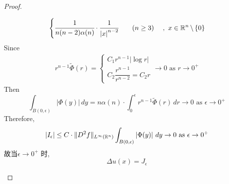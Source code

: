 \begin{thm}
\begin{proof}
\begin{enumerate}
\begin{itemize}
\begin{align}
\begin{cases}
							\cfrac{1}{n (n - 2) \alpha(n)} \cdot \cfrac{1}{\left| x \right|^{n - 2}} \hspace*{2em} (n \geq 3)
						\end{cases} , \,\, x \in \mathbb{R}^n \, \backslash \, \{ 0 \}
					\end{align}
					Since
					\begin{align}
						r^{n - 1} \widetilde{\Phi}(r) = 
						\begin{cases}
							C_1 r^{n - 1} \left| \log r \right| \\
							C_2 \dfrac{r^{n - 1}}{r^{n - 2}} = C_2 r
						\end{cases} \to 0 \,\, \text{as} \,\, r \to 0^+
					\end{align}
					Then 
					\[ \int_{B(0 , \epsilon)} \left| \Phi(y) \right| \, dy 
					= n \alpha(n) \cdot \int_{0}^\epsilon r^{n - 1} \widetilde{\Phi} (r) \, dr \to 0 \,\, \text{as} \,\, \epsilon \to 0^+ \]
					Therefore, 
					\[ \left| I_\epsilon \right| 
					\leq C \cdot \Vert D^2 f \Vert_{L^\infty (\mathbb{R}^n)} \int_{B(0 , \epsilon)} \left| \Phi(y) \right| \, dy \to 0 \,\, \text{as} \,\, \epsilon \to 0^+ \]
					故当$\epsilon \to 0^+$ 时, 
					\[ \Delta u(x) = J_\epsilon \]
					
					\newpage
					

\end{itemize}
\end{enumerate}
\end{proof}
\end{thm}
